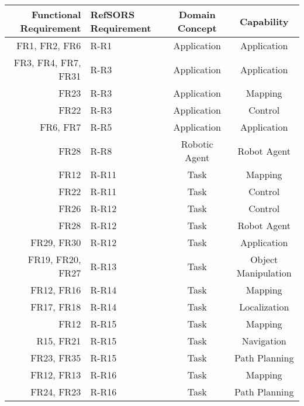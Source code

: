 {
\centering
\begin{tabular}{| r | p{2cm} | c | c |}
	\hline
	Functional Requirement & RefSORS Requirement & Domain Concept & Capability \\ 
	\hline
	FR1, FR2, FR6 & R-R1 	& Application & Application \\
	FR3, FR4, FR7, FR31 	& R-R3 & Application & Application\\
	FR23 					& R-R3 & Application & Mapping\\ %
	FR22 					& R-R3 & Application & Control\\ %
	FR6, FR7 				& R-R5 & Application & Application\\
	\hline
	FR28 					& R-R8 & Robotic Agent & Robot Agent\\
	\hline
	FR12 					& R-R11 & Task & Mapping\\
	FR22 					& R-R11 & Task & Control\\
	FR26				 	& R-R12 & Task & Control\\
	FR28				 	& R-R12 & Task & Robot Agent\\%
	FR29, FR30			 	& R-R12 & Task & Application\\%
	FR19, FR20, FR27		& R-R13 & Task & Object Manipulation\\
	FR12, FR16				& R-R14 & Task & Mapping\\
	FR17, FR18 				& R-R14 & Task & Localization\\
	FR12 					& R-R15 & Task & Mapping\\
	R15, FR21 				& R-R15 & Task & Navigation\\
	FR23, FR35				& R-R15 & Task & Path Planning\\
	FR12, FR13 				& R-R16 & Task & Mapping\\
	FR24, FR23				& R-R16 & Task & Path Planning\\

\end{tabular}}
